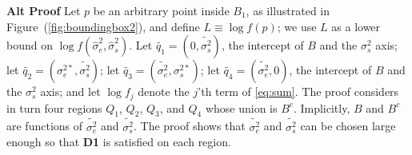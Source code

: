 \documentclass{report}
\newcommand{\RL}{f}
\newcommand{\logRL}{\log\RL}
\newcommand{\sigssq}{\sigma_s^2}
\newcommand{\sshat}{\hat\sigma^2_e,\hat\sigma^2_s}
\begin{document}
\noindent\textbf{Alt Proof}
Let $p$ be an arbitrary point inside $B_1$, as illustrated in Figure~(\ref{fig:boundingbox2}), and define $L \equiv \logRL(p)$; we use $L$ as a lower bound on $\logRL(\sshat)$.  Let $\widetilde{q_1} = (0,\widetilde{\sigma_s^2})$, the intercept of $B$ and the $\sigssq$ axis; let $\widetilde{q_2} = (\sigma_e^{2*},\widetilde{\sigma_s^2})$; let $\widetilde{q_3} = (\widetilde{\sigma_e^2}, \sigma_s^{2*})$; let $\widetilde{q_4} = (\widetilde{\sigma_e^2},0)$, the intercept of $B$ and the $\sigssq$ axis; and let $\logRL_j$ denote the $j$'th term of \eqref{eq:sum}.  The proof considers in turn four regions $Q_1$, $Q_2$, $Q_3$, and $Q_4$ whose union is $B^c$.  Implicitly, $B$ and $B^c$ are functions of $\widetilde{\sigma_e^2}$ and $\widetilde{\sigma_s^2}$.  The proof shows that $\widetilde{\sigma_e^2}$ and $\widetilde{\sigma_s^2}$ can be chosen large enough so that \textbf{D1} is satisfied on each region.  
\end{document}
